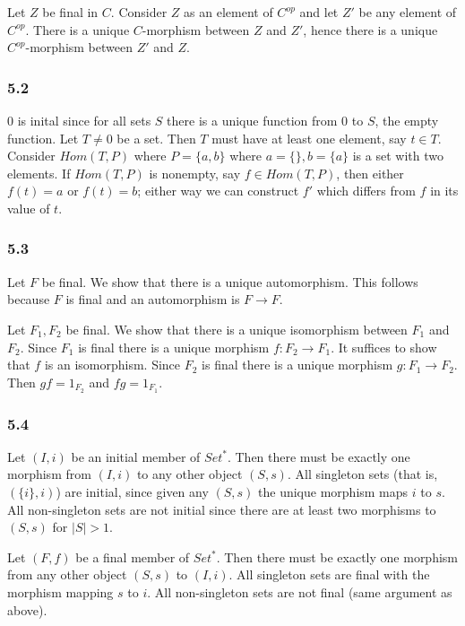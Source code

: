 \documentclass{article}
\begin{document}
Let $Z$ be final in $C$. Consider $Z$ as an element of $C^{op}$ and let $Z'$ be any element of $C^{op}$. There is a unique $C$-morphism between $Z$ and $Z'$, hence there is a unique $C^{op}$-morphism between $Z'$ and $Z$.

\subsubsection*{5.2}

$0$ is inital since for all sets $S$ there is a unique function from $0$ to $S$, the empty function. Let $T \ne 0$ be a set. Then $T$ must have at least one element, say $t \in T$. Consider $Hom(T, P)$ where $P = \{a, b\}$ where $a = \{\}, b = \{a\}$ is a set with two elements. If $Hom(T, P)$ is nonempty, say $f \in Hom(T, P)$, then either $f(t) = a$ or $f(t) = b$; either way we can construct $f'$ which differs from $f$ in its value of $t$.

\subsubsection*{5.3}

Let $F$ be final. We show that there is a unique automorphism. This follows because $F$ is final and an automorphism is $F \to F$.

Let $F_1, F_2$ be final. We show that there is a unique isomorphism between $F_1$ and $F_2$. Since $F_1$ is final there is a unique morphism $f : F_2 \to F_1$. It suffices to show that $f$ is an isomorphism. Since $F_2$ is final there is a unique morphism $g : F_1 \to F_2$. Then $gf = 1_{F_2}$ and $fg = 1_{F_1}$.

\subsubsection*{5.4}

Let $(I, i)$ be an initial member of $Set^*$. Then there must be exactly one morphism from $(I, i)$ to any other object $(S, s)$. All singleton sets (that is, $(\{i\}, i)$) are initial, since given any $(S, s)$ the unique morphism maps $i$ to $s$. All non-singleton sets are not initial since there are at least two morphisms to $(S, s)$ for $|S| > 1$.

Let $(F, f)$ be a final member of $Set^*$. Then there must be exactly one morphism from any other object $(S, s)$ to $(I, i)$. All singleton sets are final with the morphism mapping $s$ to $i$. All non-singleton sets are not final (same argument as above).
\end{document}
